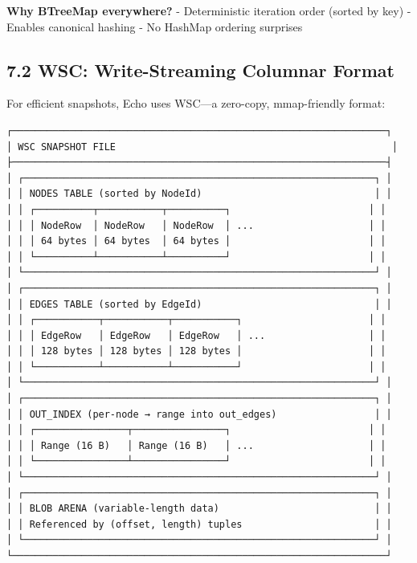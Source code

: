 \documentclass[
]{book}
\begin{document}
\textbf{Why BTreeMap everywhere?} - Deterministic iteration order
(sorted by key) - Enables canonical hashing - No HashMap ordering
surprises

\subsection{7.2 WSC: Write-Streaming Columnar
Format}\label{wsc-write-streaming-columnar-format}

For efficient snapshots, Echo uses WSC---a zero-copy, mmap-friendly
format:

\begin{verbatim}
┌─────────────────────────────────────────────────────────────────┐
│ WSC SNAPSHOT FILE                                                │
├─────────────────────────────────────────────────────────────────┤
│ ┌─────────────────────────────────────────────────────────────┐ │
│ │ NODES TABLE (sorted by NodeId)                              │ │
│ │ ┌──────────┬───────────┬──────────┐                        │ │
│ │ │ NodeRow  │ NodeRow   │ NodeRow  │ ...                    │ │
│ │ │ 64 bytes │ 64 bytes  │ 64 bytes │                        │ │
│ │ └──────────┴───────────┴──────────┘                        │ │
│ └─────────────────────────────────────────────────────────────┘ │
│ ┌─────────────────────────────────────────────────────────────┐ │
│ │ EDGES TABLE (sorted by EdgeId)                              │ │
│ │ ┌───────────┬───────────┬───────────┐                      │ │
│ │ │ EdgeRow   │ EdgeRow   │ EdgeRow   │ ...                  │ │
│ │ │ 128 bytes │ 128 bytes │ 128 bytes │                      │ │
│ │ └───────────┴───────────┴───────────┘                      │ │
│ └─────────────────────────────────────────────────────────────┘ │
│ ┌─────────────────────────────────────────────────────────────┐ │
│ │ OUT_INDEX (per-node → range into out_edges)                 │ │
│ │ ┌────────────────┬────────────────┐                        │ │
│ │ │ Range (16 B)   │ Range (16 B)   │ ...                    │ │
│ │ └────────────────┴────────────────┘                        │ │
│ └─────────────────────────────────────────────────────────────┘ │
│ ┌─────────────────────────────────────────────────────────────┐ │
│ │ BLOB ARENA (variable-length data)                           │ │
│ │ Referenced by (offset, length) tuples                       │ │
│ └─────────────────────────────────────────────────────────────┘ │
└─────────────────────────────────────────────────────────────────┘
\end{verbatim}
\end{document}
